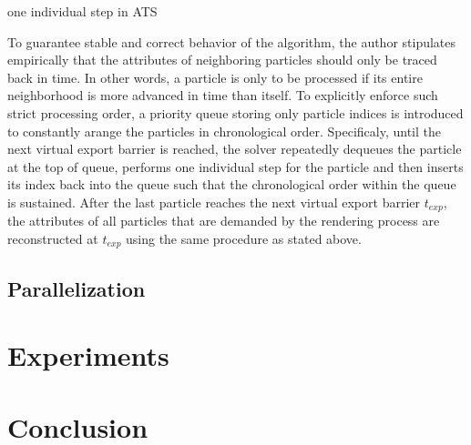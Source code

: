 \documentclass[
	11pt, 
	DIV10,
	ngerman,
	a4paper, 
	oneside, 
	headings=normal, 
	captions=tableheading,
	final, 
	numbers=noenddot
]{scrartcl}
\begin{document}
\large
\vskip 0.2in
\begin{algorithm}[H]
	\caption{\label{alg2} one individual step in ATS \cite{reinhardt2017fully}}
	\DontPrintSemicolon
	\SetAlgoLined
\end{algorithm}
\vskip 0.2in
\normalsize

To guarantee stable and correct behavior of the algorithm, the author stipulates empirically that the attributes of neighboring particles should only be traced back in time. In other words, a particle is only to be processed if its entire neighborhood is more advanced in time than itself. To explicitly enforce such strict processing order, a priority queue storing only particle indices is introduced to constantly arange the particles in chronological order. Specificaly, until the next virtual export barrier is reached, the solver repeatedly dequeues the particle at the top of queue, performs one individual step for the particle and then inserts its index back into the queue such that the chronological order within the queue is sustained. After the last particle reaches the next virtual export barrier $t_{exp}$, the attributes of all particles that are demanded by the rendering process are reconstructed at $t_{exp}$ using the same procedure as stated above.

\subsection{Parallelization}



\section{Experiments}

\section{Conclusion}



\end{document}
